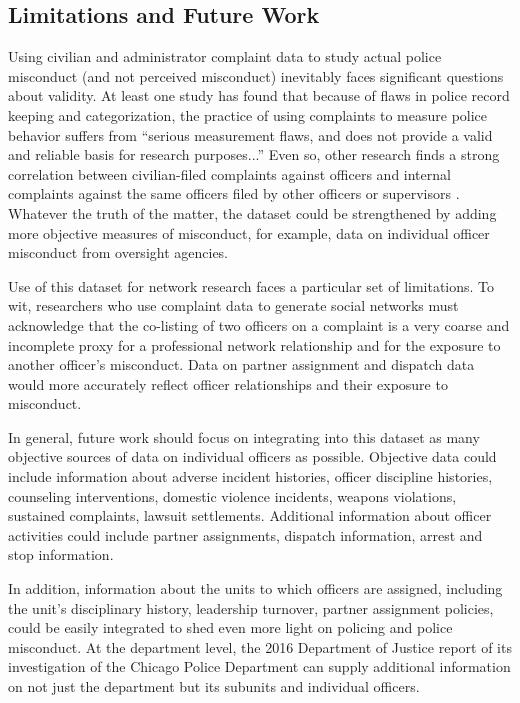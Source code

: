 \subsection{Limitations and Future Work}
Using civilian and administrator complaint data to study actual police
misconduct (and not perceived misconduct) inevitably faces significant
questions about validity. At least one study has found that because of flaws in
police record keeping and categorization, the practice of using complaints to
measure police behavior suffers from ``serious measurement flaws, and does not
provide a valid and reliable basis for research purposes...'' \cite{Hickman16} Even so, other
research finds a strong correlation between civilian-filed complaints against
officers and internal complaints against the same officers filed by other
officers or supervisors \cite{Lersch00}. Whatever the truth of the matter, the dataset could be
strengthened by adding more objective measures of misconduct, for example, data
on individual officer misconduct from oversight agencies.

Use of this dataset for network research faces a particular set of limitations.
To wit, researchers who use complaint data to generate social networks must
acknowledge that the co-listing of two officers on a complaint is a very coarse
and incomplete proxy for a professional network relationship and for the
exposure to another officer’s misconduct. Data on partner assignment and
dispatch data would more accurately reflect officer relationships and their
exposure to misconduct. 

In general, future work should focus on integrating into this dataset as many
objective sources of data on individual officers as possible. Objective data
could include information about adverse incident histories, officer discipline
histories, counseling interventions, domestic violence incidents, weapons
violations, sustained complaints, lawsuit settlements. Additional information
about officer activities could include partner assignments, dispatch
information, arrest and stop information. 

In addition, information about the units to which officers are assigned,
including the unit's disciplinary history, leadership turnover, partner
assignment policies, could be easily integrated to shed even more light on
policing and police misconduct. At the department level, the 2016 Department of
Justice report of its investigation of the Chicago Police Department can supply
additional information on not just the department but its subunits and
individual officers.
